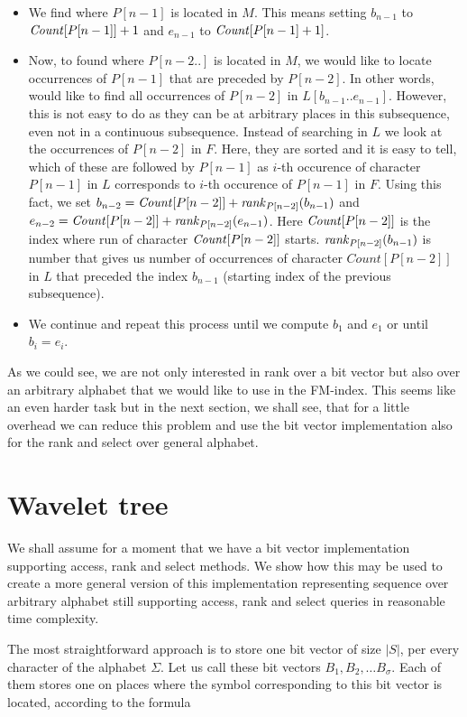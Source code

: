 \begin{itemize}
	\item We find where $P[n-1]$ is located in $M$. This means setting $b_{n-1}$ to
	$\mathit{Count}[P[n-1]]+1$ and $e_{n-1}$ to $\mathit{Count}[P[n-1]+1]$.
	\item Now, to found where $P[n-2..]$ is located in $M$, we would like to locate occurrences
	of $P[n-1]$ that are preceded by $P[n-2]$. In other words, would like to find all
	occurrences of $P[n-2]$ in $L[b_{n-1}..e_{n-1}]$. However, this is not easy to do
	as they can be at arbitrary places in this subsequence, even not in a continuous
	subsequence. Instead of searching in $L$ we look at the occurrences of $P[n-2]$ in
	$F$. Here, they are sorted and it is easy to tell, which of these are followed by
	$P[n-1]$ as $i$-th occurence of character $P[n-1]$ in $L$ corresponds to $i$-th
	occurence of $P[n-1]$ in $F$. Using this fact, we set
	$b_{n-2} = \mathit{Count}[P[n-2]] + \mathit{rank}_{P[n-2]}(b_{n-1})$ and
	$e_{n-2} = \mathit{Count}[P[n-2]] + \mathit{rank}_{P[n-2]}(e_{n-1})$. Here $\mathit{Count}[P[n-2]]$
	is the index where run of character $\mathit{Count}[P[n-2]]$ starts. $\mathit{rank}_{P[n-2]}(b_{n-1})$
	is number that gives us number of occurrences of character $Count[P[n-2]]$ in $L$ that
	preceded the index $b_{n-1}$ (starting index of the previous subsequence).
	\item We continue and repeat this process until we compute $b_1$ and $e_1$ or until
	$b_i=e_i$.
\end{itemize}

As we could see, we are not only interested in rank over a bit vector but also over an arbitrary
alphabet that we would like to use in the FM-index. This seems like an even harder task but in
the next section, we shall see, that for a little overhead we can reduce this problem and use
the bit vector implementation also for the rank and select over general alphabet.

\section{Wavelet tree}
\label{section:WaweletTree}

We shall assume for a moment that we have a bit vector implementation supporting
access, rank and select methods. We show how this may be used to create
a more general version of this implementation representing sequence over arbitrary
alphabet still supporting access, rank and select queries in reasonable time complexity.

The most straightforward approach is to store one bit vector of size $|S|$,
per every character of the alphabet $\Sigma$. Let us call these bit vectors $B_1,
B_2, \ldots B_{\sigma}$. Each of them stores one on places where the symbol corresponding
to this bit vector is located, according to the formula

